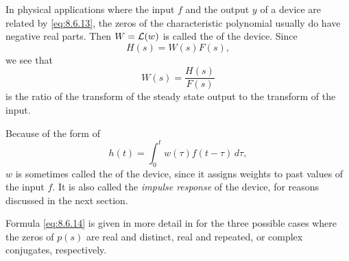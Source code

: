In physical applications where the input $f$ and the output $y$ of a
device are related by \eqref{eq:8.6.13}, the zeros of the characteristic
polynomial usually do have negative real parts. Then $W={\mathcal L}(w)$
is called the
of the device. Since
\[
H(s)=W(s)F(s),
\]
we see that
\[
W(s)=\frac{H(s)}{F(s)}
\]
is the ratio of the transform of the steady state output to the transform
of the input.

 Because of the form of
\[
h(t)=\int_0^tw(\tau)f(t-\tau)\,d\tau,
\]
$w$ is sometimes called the  of the device,
since it assigns weights to past values of the input $f$. It is also
called the \emph{\color{blue}impulse response}
of the device, for reasons
discussed in the next section.

Formula \eqref{eq:8.6.14} is given in more detail in
 for the three possible cases
where the zeros of $p(s)$ are real and distinct, real and repeated, or
complex conjugates, respectively.

\exercises

